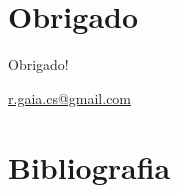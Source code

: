 \documentclass[11pt]{beamer}
\begin{document}
\section*{Obrigado}
\begin{frame}
    \begin{center}
        Obrigado!
    \end{center}
    \begin{center}
        \url{r.gaia.cs@gmail.com}
    \end{center}
\end{frame}

\section*{Bibliografia}
\begin{frame}
    
    
\end{frame}
\end{document}

